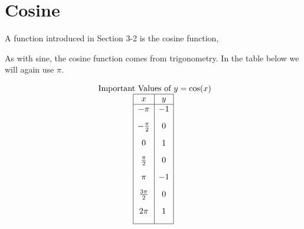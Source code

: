 \documentclass[nooutcomes]{ximera}
\begin{document}
\begin{center}  
\end{center}



\newpage


\section{Cosine}
A function introduced in Section 3-2 is the cosine function, 

\begin{center}
\end{center}


As with sine, the cosine function comes from trigonometry. In the table below we will again use $\pi$.

\begin{center}
\end{center}

\[
\begin{array}{ c }
 \text{ Important Values of  $y=\cos(x)$}\\
\begin{array}{|c|c|}
 \hline
 x & y\\
 \hline
 -\pi&-1\\[2ex]
 -\frac{\pi}{2}&0\\[2ex]
 0&1\\[2ex]
 \frac{\pi}{2}&0\\[2ex]
 \pi&-1\\[2ex]
\frac{3\pi}{2}&0\\[2ex]
 2 \pi&1\\[2ex]
\hline
\end{array}
\end{array}
\]
\end{document}
